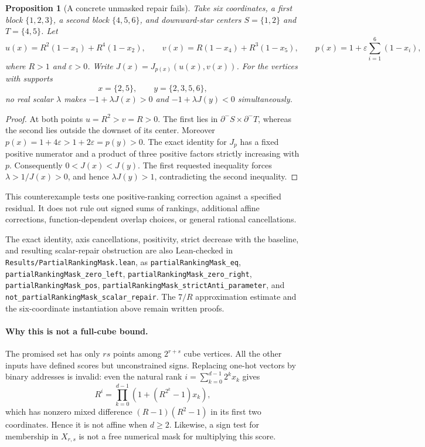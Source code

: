 \documentclass[11pt]{article}
\newtheorem{proposition}{Proposition}
\begin{document}
\begin{proposition}[A concrete unmasked repair fails]
Take six coordinates, a first block $\{1,2,3\}$, a second block
$\{4,5,6\}$, and downward-star centers $S=\{1,2\}$ and
$T=\{4,5\}$. Let
\[
 u(x)=R^2(1-x_1)+R^4(1-x_2),\qquad
 v(x)=R(1-x_4)+R^3(1-x_5),\qquad
 p(x)=1+\varepsilon\sum_{i=1}^6(1-x_i),
\]
where $R>1$ and $\varepsilon>0$. Write $J(x)=J_{p(x)}(u(x),v(x))$.
For the vertices with supports
\[
 x=\{2,5\},\qquad y=\{2,3,5,6\},
\]
no real scalar $\lambda$ makes $-1+\lambda J(x)>0$ and
$-1+\lambda J(y)<0$ simultaneously.
\end{proposition}
\begin{proof}
At both points $u=R^2>v=R>0$. The first lies in
$\partial^-S\times\partial^-T$, whereas the second lies outside
the downset of its center. Moreover
$p(x)=1+4\varepsilon>1+2\varepsilon=p(y)>0$.
The exact identity for $J_p$ has a fixed positive numerator and
a product of three positive factors strictly increasing with $p$.
Consequently $0<J(x)<J(y)$. The first requested inequality forces
$\lambda>1/J(x)>0$, and hence $\lambda J(y)>1$, contradicting
the second inequality.
\end{proof}

This counterexample tests one positive-ranking correction against a
specified residual. It does not rule out signed sums of rankings,
additional affine corrections, function-dependent overlap choices,
or general rational cancellations.

The exact identity, axis cancellations, positivity, strict decrease
with the baseline, and resulting scalar-repair obstruction are also
Lean-checked in \texttt{Results/PartialRankingMask.lean}, as
\texttt{partialRankingMask\_eq},
\texttt{partialRankingMask\_zero\_left},
\texttt{partialRankingMask\_zero\_right},
\texttt{partialRankingMask\_pos},
\texttt{partialRankingMask\_strictAnti\_parameter}, and
\texttt{not\_partialRankingMask\_scalar\_repair}.
The $7/R$ approximation estimate and the six-coordinate instantiation
above remain written proofs.

\paragraph{Why this is not a full-cube bound.}
The promised set has only $rs$ points among $2^{r+s}$ cube vertices.
All the other inputs have defined scores but unconstrained signs.
Replacing one-hot vectors by binary addresses is invalid: even the
natural rank $i=\sum_{k=0}^{d-1}2^kx_k$ gives
\[
 R^i=\prod_{k=0}^{d-1}(1+(R^{2^k}-1)x_k),
\]
which has nonzero mixed difference $(R-1)(R^2-1)$ in its first two
coordinates. Hence it is not affine when $d\geq2$.
Likewise, a sign test for membership in $X_{r,s}$ is not a free
numerical mask for multiplying this score.
\end{document}
